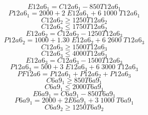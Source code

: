 \begin{equation}
E12a6_{1} = C12a6_{1} - 850 T12a6_{1}
\end{equation}
\begin{equation}
P12a6_{1} = 2000 + 2 \; E12a6_{1} + 6 \; 1000 \; T12a6_{1}
\end{equation}
\begin{equation}
C12a6_{2} \geq 1250 T12a6_{2}
\end{equation}
\begin{equation}
C12a6_{2} \leq 1750 T12a6_{2}
\end{equation}
\begin{equation}
E12a6_{2} = C12a6_{2} - 1250 T12a6_{3}
\end{equation}
\begin{equation}
P12a6_{2} = 1000 + 1.30 \; E12a6_{2} + 6 \; 2600 \; T12a6_{3}
\end{equation}
\begin{equation}
C12a6_{3} \geq 1500 T12a6_{3}
\end{equation}
\begin{equation}
C12a6_{3} \leq 4000 T12a6_{3}
\end{equation}
\begin{equation}
E12a6_{3} = C12a6_{3} - 1500 T12a6_{3}
\end{equation}
\begin{equation}
P12a6_{3} = 500 + 3 \; E12a6_{3} + 6 \; 3000 \; T12a6_{3}
\end{equation}
\begin{equation}
PF12a6 = P12a6_{1} + P12a6_{2} + P12a6_{3} 
\end{equation}
\begin{equation}
C6a9_{1} \geq 850 T6a9_{1}
\end{equation}
\begin{equation}
C6a9_{1} \leq 2000 T6a9_{1}
\end{equation}
\begin{equation}
E6a9_{1} = C6a9_{1} - 850 T6a9_{1}
\end{equation}
\begin{equation}
P6a9_{1} = 2000 + 2 E6a9_{1} + 3 \; 1000 \; T6a9_{1}
\end{equation}
\begin{equation}
C6a9_{2} \geq 1250 T6a9_{2}
\end{equation}
